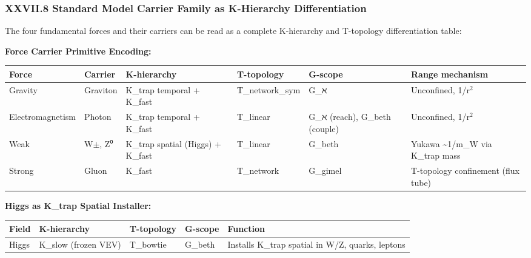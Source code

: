 \documentclass[12pt,a4paper]{article}
\begin{document}
\subsubsection{XXVII.8 Standard Model Carrier Family as K-Hierarchy Differentiation}

The four fundamental forces and their carriers can be read as a complete K-hierarchy and T-topology differentiation table:

\textbf{Force Carrier Primitive Encoding:}

\begin{table}[htbp]
\centering
\small
{}
\begin{tabularx}{\textwidth}{>{\centering\arraybackslash}X >{\centering\arraybackslash}X >{\centering\arraybackslash}X >{\centering\arraybackslash}X >{\centering\arraybackslash}X >{\centering\arraybackslash}X}
\toprule
\rowcolor{gray!25}\textbf{Force} & \textbf{Carrier} & \textbf{K-hierarchy} & \textbf{T-topology} & \textbf{G-scope} & \textbf{Range mechanism} \\
\midrule
\rowcolors{1}{white}{gray!10}
Gravity & Graviton & K\_trap temporal + K\_fast & T\_network\_sym & G\_ℵ & Unconfined, 1/r$^{2}$ \\
Electromagnetism & Photon & K\_trap temporal + K\_fast & T\_linear & G\_ℵ (reach), G\_beth (couple) & Unconfined, 1/r$^{2}$ \\
Weak & W$\pm$, Z⁰ & K\_trap spatial (Higgs) + K\_fast & T\_linear & G\_beth & Yukawa \textasciitilde{}1/m\_W via K\_trap mass \\
Strong & Gluon & K\_fast & T\_network & G\_gimel & T-topology confinement (flux tube) \\
\bottomrule
\end{tabularx}
\end{table}

\textbf{Higgs as K\_trap Spatial Installer:}

\begin{table}[htbp]
\centering
\small
{}
\begin{tabularx}{\textwidth}{>{\centering\arraybackslash}X >{\centering\arraybackslash}X >{\centering\arraybackslash}X >{\centering\arraybackslash}X >{\centering\arraybackslash}X}
\toprule
\rowcolor{gray!25}\textbf{Field} & \textbf{K-hierarchy} & \textbf{T-topology} & \textbf{G-scope} & \textbf{Function} \\
\midrule
\rowcolors{1}{white}{gray!10}
Higgs & K\_slow (frozen VEV) & T\_bowtie & G\_beth & Installs K\_trap spatial in W/Z, quarks, leptons \\
\bottomrule
\end{tabularx}
\end{table}
\end{document}
